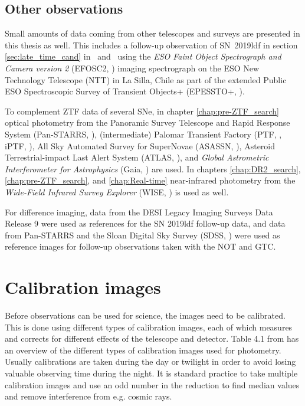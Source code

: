 \documentclass[a4paper,oneside,12pt, class=Latex/Classes/PhDthesisPSnPDF, crop=false]{standalone}
\begin{document}
\subsection{Other observations}
Small amounts of data coming from other telescopes and surveys are presented in this thesis as well. This includes a follow-up observation of SN~2019ldf in section \ref{sec:late_time_cand} in \ztfg\ and \ztfr\ using the \textit{ESO Faint Object Spectrograph and Camera version 2} (EFOSC2, \citealt{EFOSC2}) imaging spectrograph on the ESO New Technology Telescope (NTT) in La Silla, Chile as part of the extended Public ESO Spectroscopic Survey of Transient Objects+ (EPESSTO+, \citealt{PESSTO}).

To complement ZTF data of several SNe, in chapter \ref{chap:pre-ZTF_search} optical photometry from the Panoramic Survey Telescope and Rapid Response System (Pan-STARRS, \citealt{Pan-STARRS1}), (intermediate) Palomar Transient Factory (PTF, \citealt{PTF_1, PTF_2}, iPTF, \citealt{iPTF}), All Sky Automated Survey for SuperNovae (ASASSN, \citealt{ASASSN_paper1, ASASSN_catalog}), Asteroid Terrestrial-impact Last Alert System (ATLAS, \citealt{ATLAS}), and \textit{Global Astrometric Interferometer for Astrophysics} (Gaia, \citealt{Gaia}) are used. In chapters \ref{chap:DR2_search}, \ref{chap:pre-ZTF_search}, and \ref{chap:Real-time} near-infrared photometry from the \textit{Wide-Field Infrared Survey Explorer} (WISE, \citealt{WISE}) is used as well.

For difference imaging, data from the DESI Legacy Imaging Surveys Data Release 9 \citep{DESI-Legacy_Imaging_Surveys} were used as references for the SN 2019ldf follow-up data, and data from Pan-STARRS and the Sloan Digital Sky Survey (SDSS, \citealt{SDSS-I-II, SDSS_DR4, SDSS_telescope, SDSS_Spectograph}) were used as reference images for follow-up observations taken with the NOT and GTC.


\section{Calibration images}
\label{calibration}
Before observations can be used for science, the images need to be calibrated. This is done using different types of calibration images, each of which measures and corrects for different effects of the telescope and detector. Table 4.1 from \citet{CCD_handbook} has an overview of the different types of calibration images used for photometry. Usually calibrations are taken during the day or twilight in order to avoid losing valuable observing time during the night. It is standard practice to take multiple calibration images and use an odd number in the reduction to find median values and remove interference from e.g. cosmic rays.
\end{document}
